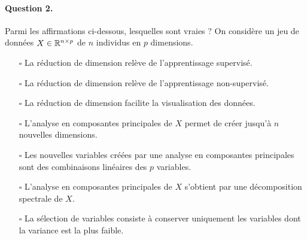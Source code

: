 \paragraph{Question 2.} Parmi les affirmations ci-dessous, lesquelles sont vraies ? On considère un jeu de données $X \in \mathbb{R}^{n \times p}$ de $n$ individus en $p$ dimensions.
\begin{itemize}
\item[$\square$] La réduction de dimension relève de l'apprentissage supervisé.
\item[$\square$] La réduction de dimension relève de l'apprentissage non-supervisé.
\item[$\square$] La réduction de dimension facilite la visualisation des données.
\item[$\square$] L'analyse en composantes principales de $X$ permet de créer jusqu'à $n$ nouvelles dimensions. 
\item[$\square$] Les nouvelles variables créées par une analyse en composantes principales sont des combinaisons linéaires des $p$ variables.
\item[$\square$] L'analyse en composantes principales de $X$ s'obtient par une décomposition spectrale de $X$.
\item[$\square$] La sélection de variables consiste à conserver uniquement les variables dont la variance est la plus faible.
\end{itemize}

